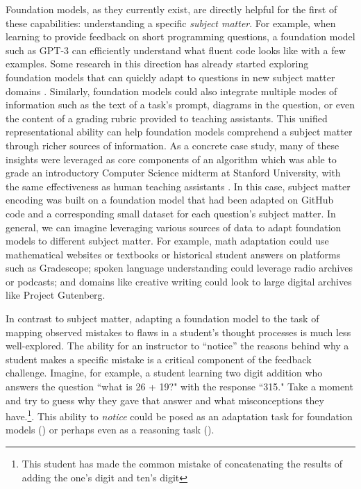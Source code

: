 Foundation models, as they currently exist, are directly helpful for the first of these capabilities: understanding a specific \emph{subject matter}. For example, when learning to provide feedback on short programming questions, a foundation model such as GPT-3 can efficiently understand what fluent code looks like with a few examples. Some research in this direction has already started exploring foundation models that can quickly adapt to questions in new subject matter domains \cite{wu2021prototransf, condor2021sbert}.
Similarly, foundation models could also integrate multiple modes of information such as the text of a task's prompt, diagrams in the question, or even the content of a grading rubric provided to teaching assistants. This unified representational ability can help foundation models comprehend a subject matter through richer sources of information. 
As a concrete case study, many of these insights were leveraged as core components of an algorithm which was able to grade an introductory Computer Science midterm at Stanford University, with the same effectiveness as human teaching assistants \citep{wu2021prototransf}. In this case, subject matter encoding was built on a foundation model that had been adapted on GitHub code and a corresponding small dataset for each question's subject matter.
In general, we can imagine leveraging various sources of data to adapt foundation models to different subject matter. For example, math adaptation could use mathematical websites or textbooks \cite{shen2021mathbert} or  historical student answers on platforms such as Gradescope; spoken language understanding could leverage radio archives or podcasts; and domains like creative writing could look to large digital archives like Project Gutenberg.


In contrast to subject matter, adapting a foundation model to the task of mapping observed mistakes to flaws in a student's thought processes is much less well-explored. The ability for an instructor to ``notice'' the reasons behind why a student makes a specific mistake is a critical component of the feedback challenge. Imagine, for example, a student learning two digit addition who answers the question ``what is 26 + 19?" with the response ``315." Take a moment and try to guess why they gave that answer and what misconceptions they have.\footnote{This student has made the common mistake of concatenating the results of adding the one's digit and ten's digit}. This ability to \emph{notice} could be posed as an adaptation task for foundation models () or perhaps even as a reasoning task ().  

